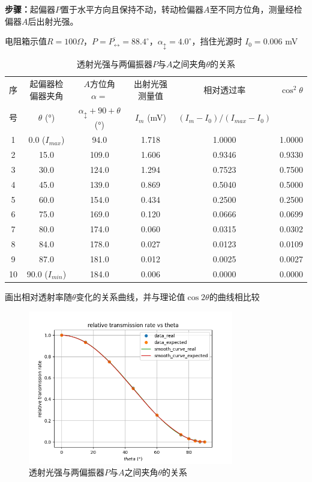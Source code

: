 \documentclass[UTF8]{ctexart}
\begin{document}
\textbf{步骤：}起偏器$P$置于水平方向且保持不动，转动检偏器$A$至不同方位角，测量经检偏器$A$后出射光强。

电阻箱示值$R = 100 \Omega$，$P=\overline{P_{\leftrightarrow}}=88.4^{\circ}$，$\alpha_{\updownarrow} = 4.0^{\circ}$，挡住光源时 $I_0 = 0.006 $ mV

\begin{table}[h]
    \centering
    \begin{tabular}{|c|c|c|c|c|c|}
    \hline
        序 & 起偏器检偏器夹角 & $A$方位角 $\alpha=$ & 出射光强测量值 & 相对透过率 & $\cos^2\theta$ \\
        号 & $\theta$ (°) & $\alpha_{\updownarrow}+90+\theta$ (°) & $I_m$ (mV) & $(I_m- I_0)/ (I_{max}- I_0)$ & \\ \hline
        1 & 0.0 ($I_{max}$) & 94.0 & 1.718 & 1.0000 & 1.0000 \\ \hline
        2 & 15.0 & 109.0 & 1.606 & 0.9346 & 0.9330 \\ \hline
        3 & 30.0 & 124.0 & 1.294 & 0.7523 & 0.7500 \\ \hline
        4 & 45.0 & 139.0 & 0.869 & 0.5040 & 0.5000 \\ \hline
        5 & 60.0 & 154.0 & 0.434 & 0.2500 & 0.2500 \\ \hline
        6 & 75.0 & 169.0 & 0.120 & 0.0666 & 0.0699 \\ \hline
        7 & 80.0 & 174.0 & 0.060 & 0.0315 & 0.0302 \\ \hline
        8 & 84.0 & 178.0 & 0.027 & 0.0123 & 0.0109 \\ \hline
        9 & 87.0 & 181.0 & 0.012 & 0.0025 & 0.0027 \\ \hline
        10 & 90.0 ($I_{min}$) & 184.0 & 0.006 & 0.0000 & 0.0000 \\ \hline
    \end{tabular}
    \caption{透射光强与两偏振器$P$与$A$之间夹角$\theta$的关系}
    \label{tab:1.5.1}
\end{table}

画出相对透射率随$\theta$变化的关系曲线，并与理论值$\cos2\theta$的曲线相比较

\begin{figure}[h]
    \centering
    \includegraphics[width=0.8\textwidth]{img/relative_transmission_rate_vs_theta.png}
    \caption{透射光强与两偏振器$P$与$A$之间夹角$\theta$的关系}
    \label{fig:1.5.1}
\end{figure}
\end{document}
